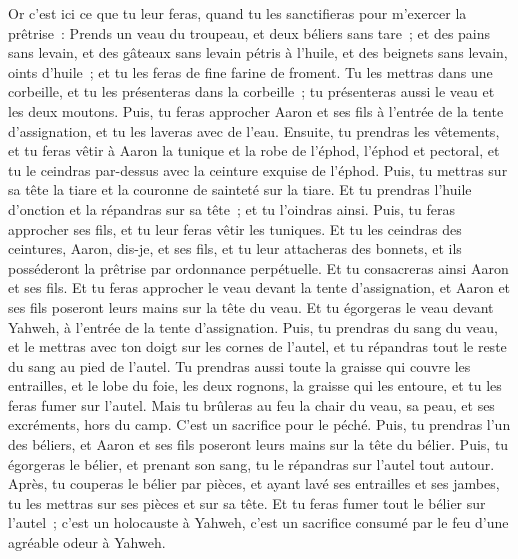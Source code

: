 \begin{multicols}{2}
\VerseOne{}Or c'est ici ce que tu leur feras, quand tu les sanctifieras pour m'exercer la prêtrise~: Prends un veau du troupeau, et deux béliers sans tare~;
et des pains sans levain, et des gâteaux sans levain pétris à l'huile, et des beignets sans levain, oints d'huile~; et tu les feras de fine farine de froment.
Tu les mettras dans une corbeille, et tu les présenteras dans la corbeille~; tu présenteras aussi le veau et les deux moutons.
Puis, tu feras approcher Aaron et ses fils à l'entrée de la tente d'assignation, et tu les laveras avec de l'eau.
Ensuite, tu prendras les vêtements, et tu feras vêtir à Aaron la tunique et la robe de l'éphod, l'éphod et pectoral, et tu le ceindras par-dessus avec la ceinture exquise de l'éphod.
Puis, tu mettras sur sa tête la tiare et la couronne de sainteté sur la tiare.
Et tu prendras l'huile d'onction et la répandras sur sa tête~; et tu l'oindras ainsi.
Puis, tu feras approcher ses fils, et tu leur feras vêtir les tuniques.
Et tu les ceindras des ceintures, Aaron, dis-je, et ses fils, et tu leur attacheras des bonnets, et ils posséderont la prêtrise par ordonnance perpétuelle. Et tu consacreras ainsi Aaron et ses fils.
Et tu feras approcher le veau devant la tente d'assignation, et Aaron et ses fils poseront leurs mains sur la tête du veau.
Et tu égorgeras le veau devant Yahweh, à l'entrée de la tente d'assignation.
Puis, tu prendras du sang du veau, et le mettras avec ton doigt sur les cornes de l'autel, et tu répandras tout le reste du sang au pied de l'autel.
Tu prendras aussi toute la graisse qui couvre les entrailles, et le lobe du foie, les deux rognons, la graisse qui les entoure, et tu les feras fumer sur l'autel.
Mais tu brûleras au feu la chair du veau, sa peau, et ses excréments, hors du camp. C'est un sacrifice pour le péché.
Puis, tu prendras l'un des béliers, et Aaron et ses fils poseront leurs mains sur la tête du bélier.
Puis, tu égorgeras le bélier, et prenant son sang, tu le répandras sur l'autel tout autour.
Après, tu couperas le bélier par pièces, et ayant lavé ses entrailles et ses jambes, tu les mettras sur ses pièces et sur sa tête.
 Et tu feras fumer tout le bélier sur l'autel~; c'est un holocauste à Yahweh, c'est un sacrifice consumé par le feu d'une agréable odeur à Yahweh.

\end{multicols}
